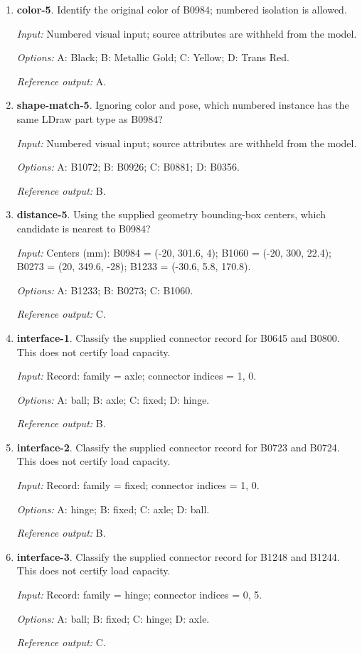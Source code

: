 \begin{enumerate}
\item \textbf{color-5}. Identify the original color of B0984; numbered isolation is allowed.\par {\small \textit{Input:} Numbered visual input; source attributes are withheld from the model. \par\textit{Options:} A: Black; B: Metallic Gold; C: Yellow; D: Trans Red. \par\textit{Reference output:} A.}
\item \textbf{shape-match-5}. Ignoring color and pose, which numbered instance has the same LDraw part type as B0984?\par {\small \textit{Input:} Numbered visual input; source attributes are withheld from the model. \par\textit{Options:} A: B1072; B: B0926; C: B0881; D: B0356. \par\textit{Reference output:} B.}
\item \textbf{distance-5}. Using the supplied geometry bounding-box centers, which candidate is nearest to B0984?\par {\small \textit{Input:} Centers (mm): B0984 = (-20, 301.6, 4); B1060 = (-20, 300, 22.4); B0273 = (20, 349.6, -28); B1233 = (-30.6, 5.8, 170.8). \par\textit{Options:} A: B1233; B: B0273; C: B1060. \par\textit{Reference output:} C.}
\item \textbf{interface-1}. Classify the supplied connector record for B0645 and B0800. This does not certify load capacity.\par {\small \textit{Input:} Record: family = axle; connector indices = 1, 0. \par\textit{Options:} A: ball; B: axle; C: fixed; D: hinge. \par\textit{Reference output:} B.}
\item \textbf{interface-2}. Classify the supplied connector record for B0723 and B0724. This does not certify load capacity.\par {\small \textit{Input:} Record: family = fixed; connector indices = 1, 0. \par\textit{Options:} A: hinge; B: fixed; C: axle; D: ball. \par\textit{Reference output:} B.}
\item \textbf{interface-3}. Classify the supplied connector record for B1248 and B1244. This does not certify load capacity.\par {\small \textit{Input:} Record: family = hinge; connector indices = 0, 5. \par\textit{Options:} A: ball; B: fixed; C: hinge; D: axle. \par\textit{Reference output:} C.}

\end{enumerate}
